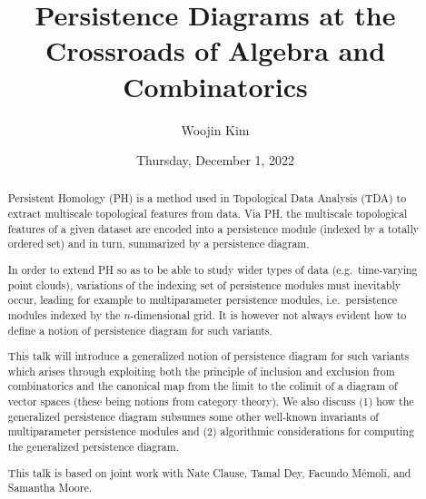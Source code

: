 \documentclass{UAmathtalk}
\author{Woojin Kim}
\title{Persistence Diagrams at the Crossroads of Algebra and Combinatorics}
\date{Thursday, December 1, 2022}
\begin{document}
\maketitle

\begin{abstract}
Persistent Homology (PH) is a method used in Topological Data Analysis (TDA) to extract multiscale topological features from data. Via PH, the multiscale topological features of a given dataset are encoded into a persistence module (indexed by a totally ordered set) and in turn, summarized by a persistence diagram.

In order to extend PH so as to be able to study wider types of data (e.g.\ time-varying point clouds), variations of the indexing set of persistence modules must inevitably occur, leading for example to multiparameter persistence modules, i.e.\ persistence modules indexed by the $n$-dimensional grid. It is however not always evident how to define a notion of persistence diagram for such variants.

This talk will introduce a generalized notion of persistence diagram for such variants which arises through exploiting both the principle of inclusion and exclusion from combinatorics and the canonical map from the limit to the colimit of a diagram of vector spaces (these being notions from category theory). We also discuss (1) how the generalized persistence diagram subsumes some other well-known invariants of multiparameter persistence modules and (2) algorithmic considerations for computing the generalized persistence diagram.

This talk is based on joint work with Nate Clause, Tamal Dey, Facundo Mémoli, and Samantha Moore.
\end{abstract}
\end{document}
